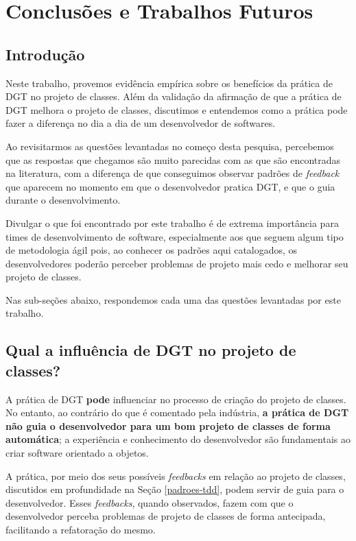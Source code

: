 \chapter{Conclusões e Trabalhos Futuros}
\label{cap:conclusoes}

\section{Introdução}

Neste trabalho, provemos evidência empírica sobre os benefícios da prática de DGT
no projeto de classes.
Além da validação da afirmação de que a prática de DGT
melhora o projeto de classes, discutimos e entendemos como a prática pode
fazer a diferença no dia a dia de um desenvolvedor de softwares.

Ao revisitarmos as questões levantadas no começo desta pesquisa,
percebemos que as respostas que chegamos são muito parecidas
com as que são encontradas na literatura, com a diferença de 
que conseguimos observar padrões de \textit{feedback} que aparecem
no momento em que o desenvolvedor pratica DGT, e que o guia durante
o desenvolvimento.

Divulgar o que foi encontrado por este trabalho é de extrema importância
para times de desenvolvimento de software, especialmente aos que seguem
algum tipo de metodologia ágil pois, ao conhecer os padrões aqui catalogados,
os desenvolvedores poderão perceber problemas de projeto mais cedo e
melhorar seu projeto de classes.

Nas sub-seções abaixo, respondemos cada uma das questões levantadas
por este trabalho.

\section{Qual a influência de DGT no projeto de classes?}

A prática de DGT \textbf{pode} influenciar no processo de criação do projeto de classes.
No entanto, ao contrário do que é comentado pela indústria,
\textbf{a prática de DGT não guia o desenvolvedor para um bom projeto de classes
de forma automática}; a experiência e conhecimento 
do desenvolvedor são fundamentais ao criar software orientado a objetos. 

A prática, por meio dos seus possíveis \textit{feedbacks} em relação ao
projeto de classes, discutidos
em profundidade na Seção \ref{padroes-tdd}, podem servir de guia
para o desenvolvedor. Esses \textit{feedbacks}, quando observados, fazem
com que o desenvolvedor perceba problemas de projeto de classes de
forma antecipada, facilitando a refatoração do mesmo.

